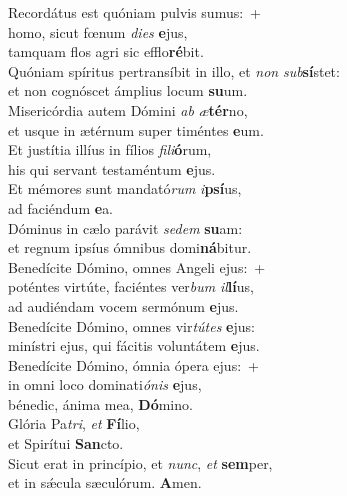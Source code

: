 \evenverse Recordátus est quóniam pulvis sumus:~+\\\evenverse  homo, sicut fœnum \textit{di}\textit{es} \textbf{e}jus,~\*\\
\evenverse tamquam flos agri sic efflo\textbf{ré}bit.\\
\oddverse Quóniam spíritus pertransíbit in illo, et \textit{non} \textit{sub}\textbf{sí}stet:~\*\\
\oddverse et non cognóscet ámplius locum \textbf{su}um.\\
\evenverse Misericórdia autem Dómini \textit{ab} \textit{æ}\textbf{tér}no,~\*\\
\evenverse et usque in ætérnum super timéntes \textbf{e}um.\\
\oddverse Et justítia illíus in fílios \textit{fi}\textit{li}\textbf{ó}rum,~\*\\
\oddverse his qui servant testaméntum \textbf{e}jus.\\
\evenverse Et mémores sunt mandató\textit{rum} \textit{i}\textbf{psí}us,~\*\\
\evenverse ad faciéndum \textbf{e}a.\\
\oddverse Dóminus in cælo parávit \textit{se}\textit{dem} \textbf{su}am:~\*\\
\oddverse et regnum ipsíus ómnibus domi\textbf{ná}bitur.\\
\evenverse Benedícite Dómino, omnes Angeli ejus:~+\\
\evenverse  poténtes virtúte, faciéntes ver\textit{bum} \textit{il}\textbf{lí}us,~\*\\
\evenverse ad audiéndam vocem sermónum \textbf{e}jus.\\
\oddverse Benedícite Dómino, omnes vir\textit{tú}\textit{tes} \textbf{e}jus:~\*\\
\oddverse minístri ejus, qui fácitis voluntátem \textbf{e}jus.\\
\evenverse Benedícite Dómino, ómnia ópera ejus:~+\\
\evenverse  in omni loco dominati\textit{ó}\textit{nis} \textbf{e}jus,~\*\\
\evenverse bénedic, ánima mea, \textbf{Dó}mino.\\
\oddverse Glória Pa\textit{tri}, \textit{et} \textbf{Fí}lio,~\*\\
\oddverse et Spirítui \textbf{San}cto.\\
\evenverse Sicut erat in princípio, et \textit{nunc}, \textit{et} \textbf{sem}per,~\*\\
\evenverse et in sǽcula sæculórum. \textbf{A}men.\\
